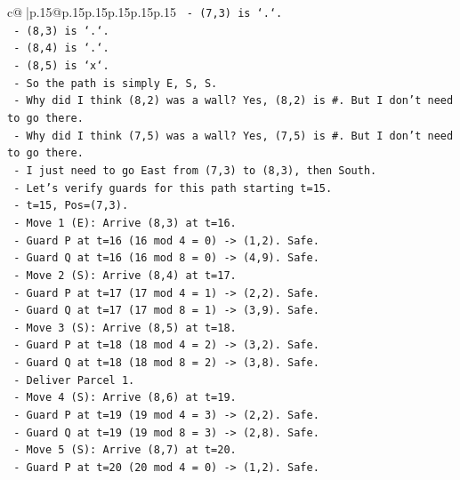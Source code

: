 \documentclass{article}
\begin{document}
{\begin{supertabular}{c@{$\;$}|p{.15\linewidth}@{}p{.15\linewidth}p{.15\linewidth}p{.15\linewidth}p{.15\linewidth}p{.15\linewidth}}
{{{\texttt{          {-} (7,3) is `.`.} \\
\texttt{          {-} (8,3) is `.`.} \\
\texttt{          {-} (8,4) is `.`.} \\
\texttt{          {-} (8,5) is `x`.} \\
\texttt{          {-} So the path is simply E, S, S.} \\
\texttt{          {-} Why did I think (8,2) was a wall? Yes, (8,2) is \#. But I don't need to go there.} \\
\texttt{          {-} Why did I think (7,5) was a wall? Yes, (7,5) is \#. But I don't need to go there.} \\
\texttt{          {-} I just need to go East from (7,3) to (8,3), then South.} \\
\texttt{          {-} Let's verify guards for this path starting t=15.} \\
\texttt{          {-} t=15, Pos=(7,3).} \\
\texttt{          {-} Move 1 (E): Arrive (8,3) at t=16.} \\
\texttt{            {-} Guard P at t=16 (16 mod 4 = 0) {-}> (1,2). Safe.} \\
\texttt{            {-} Guard Q at t=16 (16 mod 8 = 0) {-}> (4,9). Safe.} \\
\texttt{          {-} Move 2 (S): Arrive (8,4) at t=17.} \\
\texttt{            {-} Guard P at t=17 (17 mod 4 = 1) {-}> (2,2). Safe.} \\
\texttt{            {-} Guard Q at t=17 (17 mod 8 = 1) {-}> (3,9). Safe.} \\
\texttt{          {-} Move 3 (S): Arrive (8,5) at t=18.} \\
\texttt{            {-} Guard P at t=18 (18 mod 4 = 2) {-}> (3,2). Safe.} \\
\texttt{            {-} Guard Q at t=18 (18 mod 8 = 2) {-}> (3,8). Safe.} \\
\texttt{            {-} Deliver Parcel 1.} \\
\texttt{          {-} Move 4 (S): Arrive (8,6) at t=19.} \\
\texttt{            {-} Guard P at t=19 (19 mod 4 = 3) {-}> (2,2). Safe.} \\
\texttt{            {-} Guard Q at t=19 (19 mod 8 = 3) {-}> (2,8). Safe.} \\
\texttt{          {-} Move 5 (S): Arrive (8,7) at t=20.} \\
\texttt{            {-} Guard P at t=20 (20 mod 4 = 0) {-}> (1,2). Safe.} \\
}}}
\end{supertabular}}
\end{document}
